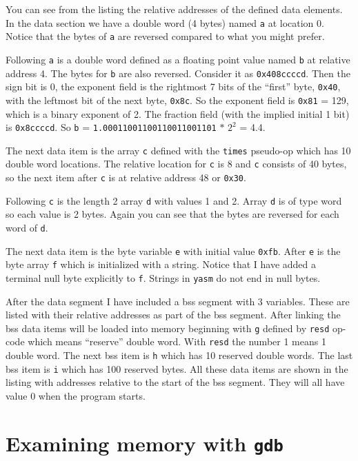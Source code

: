 \documentclass[11pt,b5paper]{book}
\begin{document}
You can see from the listing the relative addresses of the defined data elements.
In the data section we have a double word (4 bytes) named {\tt a} at location 0.
Notice that the bytes of {\tt a} are reversed compared to what you might prefer.

Following {\tt a} is a double word defined as a floating point value
named {\tt b} at relative address 4.
The bytes for {\tt b} are also reversed.
Consider it as {\tt 0x408ccccd}.  Then the sign bit is 0, the exponent
field is the rightmost 7 bits of the ``first'' byte, {\tt 0x40}, with
the leftmost bit of the next byte, {\tt 0x8c}.
So the exponent field is {\tt 0x81} = 129, which is a binary exponent of 2.
The fraction field (with the implied initial 1 bit) is {\tt 0x8ccccd}.
So {\tt b} = {\tt 1.00011001100110011001101} $*$ $2^2$ = 4.4.

The next data item is the array {\tt c} defined with the {\tt times} pseudo-op which has 10 double word locations.
The relative location for {\tt c} is 8 and {\tt c} consists of 40 bytes, so the next item after {\tt c} is at relative address 48 or {\tt 0x30}.

Following {\tt c} is the length 2 array {\tt d} with values 1 and 2.
Array {\tt d} is of type word so each value is 2 bytes.
Again you can see that the bytes are reversed for each word of {\tt d}.

The next data item is the byte variable {\tt e} with initial value
{\tt 0xfb}.
After {\tt e} is the byte array {\tt f} which is initialized with a
string.
Notice that I have added a terminal null byte explicitly to {\tt f}.
Strings in {\tt yasm} do not end in null bytes.

After the data segment I have included a bss segment with 3 variables.
These are listed with their relative addresses as part of the bss segment.
After linking the bss data items will be loaded into memory beginning 
with {\tt g} defined by {\tt resd} op-code which means ``reserve'' double word.
With {\tt resd} the number 1 means 1 double word.
The next bss item is {\tt h} which has 10 reserved double words.
The last bss item is {\tt i} which has 100 reserved bytes.
All these data items are shown in the listing with addresses relative to the
start of the bss segment.
They will all have value 0 when the program starts.

\section{Examining memory with {\tt gdb}}
\end{document}
